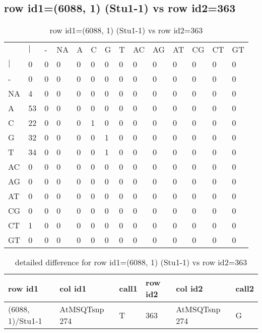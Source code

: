 \subsection{row id1=(6088, 1) (Stu1-1) vs row id2=363}
\begin{center}
\begin{longtable}{|l|l|l|l|l|l|l|l|l|l|l|l|l|l|}
\caption{row id1=(6088, 1) (Stu1-1) vs row id2=363} \label{table_dm46}\\
\hline
\\
\hline
&$|$&-&NA&A&C&G&T&AC&AG&AT&CG&CT&GT\\
$|$&0&0&0&0&0&0&0&0&0&0&0&0&0\\
-&0&0&0&0&0&0&0&0&0&0&0&0&0\\
NA&4&0&0&0&0&0&0&0&0&0&0&0&0\\
A&53&0&0&0&0&0&0&0&0&0&0&0&0\\
C&22&0&0&0&1&0&0&0&0&0&0&0&0\\
G&32&0&0&0&0&1&0&0&0&0&0&0&0\\
T&34&0&0&0&0&1&0&0&0&0&0&0&0\\
AC&0&0&0&0&0&0&0&0&0&0&0&0&0\\
AG&0&0&0&0&0&0&0&0&0&0&0&0&0\\
AT&0&0&0&0&0&0&0&0&0&0&0&0&0\\
CG&0&0&0&0&0&0&0&0&0&0&0&0&0\\
CT&1&0&0&0&0&0&0&0&0&0&0&0&0\\
GT&0&0&0&0&0&0&0&0&0&0&0&0&0\\
\hline
\end{longtable}
\end{center}

\begin{center}
\begin{longtable}{|l|l|l|l|l|l|}
\caption{detailed difference for row id1=(6088, 1) (Stu1-1) vs row id2=363} \label{table_dm47}\\
\hline
row id1&col id1&call1&row id2&col id2&call2\\
\hline
(6088, 1)/Stu1-1&AtMSQTsnp 274&T&363&AtMSQTsnp 274&G\\
\hline
\end{longtable}
\end{center}

